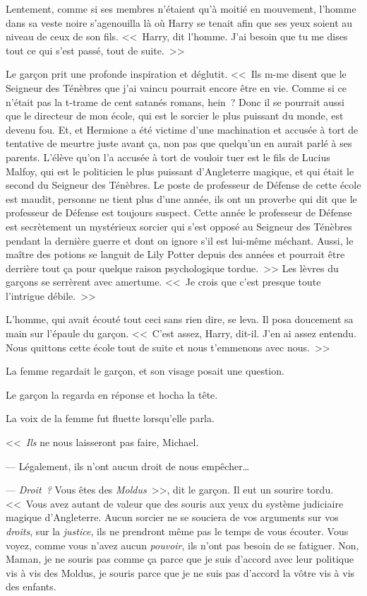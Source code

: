 Lentement, comme si ses membres n'étaient qu'à moitié en mouvement, l'homme dans sa veste noire s'agenouilla là où Harry se tenait afin que ses yeux soient au niveau de ceux de son fils. <<~Harry, dit l'homme. J'ai besoin que tu me dises tout ce qui s'est passé, tout de suite.~>>

Le garçon prit une profonde inspiration et déglutit. <<~Ils m-me disent que le Seigneur des Ténèbres que j'ai vaincu pourrait encore être en vie. Comme si ce n'était pas la t-trame de cent satanés romans, hein~? Donc il se pourrait aussi que le directeur de mon école, qui est le sorcier le plus puissant du monde, est devenu fou. Et, et Hermione a été victime d'une machination et accusée à tort de tentative de meurtre juste avant ça, non pas que quelqu'un en aurait parlé à ses parents. L'élève qu'on l'a accusée à tort de vouloir tuer est le fils de Lucius Malfoy, qui est le politicien le plus puissant d'Angleterre magique, et qui était le second du Seigneur des Ténèbres. Le poste de professeur de Défense de cette école est maudit, personne ne tient plus d'une année, ils ont un proverbe qui dit que le professeur de Défense est toujours suspect. Cette année le professeur de Défense est secrètement un mystérieux sorcier qui s'est opposé au Seigneur des Ténèbres pendant la dernière guerre et dont on ignore s'il est lui-même méchant. Aussi, le maître des potions se languit de Lily Potter depuis des années et pourrait être derrière tout ça pour quelque raison psychologique tordue.~>> Les lèvres du garçons se serrèrent avec amertume. <<~Je crois que c'est presque toute l'intrigue débile.~>>

L'homme, qui avait écouté tout ceci sans rien dire, se leva. Il posa doucement sa main sur l'épaule du garçon. <<~C'est assez, Harry, dit-il. J'en ai assez entendu. Nous quittons cette école tout de suite et nous t'emmenons avec nous.~>>

La femme regardait le garçon, et son visage posait une question.

Le garçon la regarda en réponse et hocha la tête.

La voix de la femme fut fluette lorsqu'elle parla.

<<~\emph{Ils} ne nous laisseront pas faire, Michael.

--- Légalement, ils n'ont aucun droit de nous empêcher…

--- \emph{Droit~?} Vous êtes des \emph{Moldus}~>>, dit le garçon. Il eut un sourire tordu. <<~Vous avez autant de valeur que des souris aux yeux du système judiciaire magique d'Angleterre. Aucun sorcier ne se souciera de vos arguments sur vos \emph{droits}, sur la \emph{justice}, ils ne prendront même pas le temps de vous écouter. Vous voyez, comme vous n'avez aucun \emph{pouvoir}, ils n'ont pas besoin de se fatiguer. Non, Maman, je ne souris pas comme ça parce que je suis d'accord avec leur politique vis à vis des Moldus, je souris parce que je ne suis pas d'accord la vôtre vis à vis des enfants.

